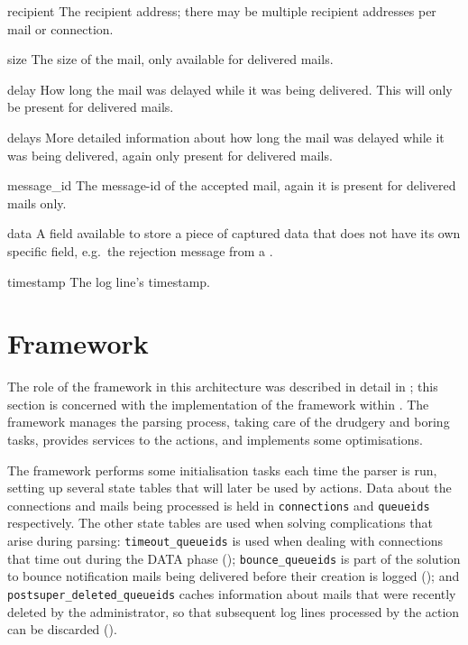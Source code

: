 \begin{boldeqlist}
    \item [recipient] The recipient address; there may be multiple
        recipient addresses per mail or connection.

    \item [size] The size of the mail, only available for delivered mails.

    \item [delay] How long the mail was delayed while it was being
        delivered.  This will only be present for delivered mails.

    \item [delays] More detailed information about how long the mail was
        delayed while it was being delivered, again only present for
        delivered mails.

    \item [message\_id] The message-id of the accepted mail, again it is
        present for delivered mails only.

    \item [data] A field available to store a piece of captured data that
        does not have its own specific field, e.g.\ the rejection message
        from a \@.

    \item [timestamp] The log line's timestamp.

\end{boldeqlist}



\section{Framework}

\label{framework in implementation}

The role of the framework in this architecture was described in detail in
; this section is concerned with the
implementation of the framework within \parsername{}.  The framework
manages the parsing process, taking care of the drudgery and boring tasks,
provides services to the actions, and implements some optimisations.

The framework performs some initialisation tasks each time the parser is
run, setting up several state tables that will later be used by actions.
Data about the connections and mails being processed is held in
\texttt{connections} and \texttt{queueids} respectively.  The other state
tables are used when solving complications that arise during parsing:
\texttt{timeout\_queueids} is used when dealing with connections that time
out during the DATA phase ();
\texttt{bounce\_queueids} is part of the solution to bounce notification
mails being delivered before their creation is logged (); and
\texttt{postsuper\_deleted\_queueids} caches information about mails that
were recently deleted by the administrator, so that subsequent log lines
processed by the  action can be discarded
().

